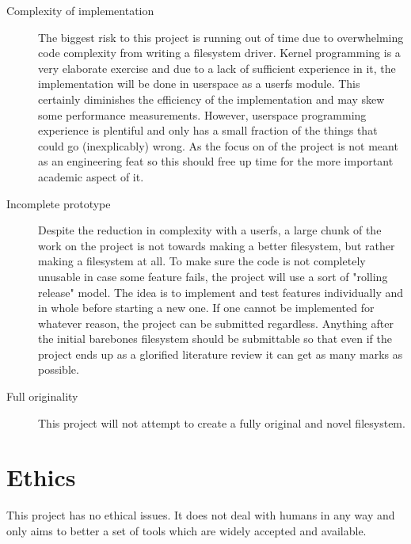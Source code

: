     \begin{description}

        \item[Complexity of implementation] The biggest risk to this project is
            running out of time due to overwhelming code complexity from
            writing a filesystem driver. Kernel programming is a very elaborate
            exercise and due to a lack of sufficient experience in it, the
            implementation will be done in userspace as a userfs module. This
            certainly diminishes the efficiency of the implementation and may
            skew some performance measurements. However, userspace programming
            experience is plentiful and only has a small fraction of the things
            that could go (inexplicably) wrong. As the focus on of the project
            is not meant as an engineering feat so this should free up time for
            the more important academic aspect of it.

        \item[Incomplete prototype] Despite the reduction in complexity with a
            userfs, a large chunk of the work on the project is not towards
            making a better filesystem, but rather making a filesystem at all.
            To make sure the code is not completely unusable in case some
            feature fails, the project will use a sort of "rolling release"
            model. The idea is to implement and test features individually and
            in whole before starting a new one. If one cannot be implemented
            for whatever reason, the project can be submitted regardless.
            Anything after the initial barebones filesystem should be
            submittable so that even if the project ends up as a glorified
            literature review it can get as many marks as possible.

        \item[Full originality] This project will not attempt to create a fully
            original and novel filesystem.

    \end{description}

%
%
\section{Ethics}

    This project has no ethical issues. It does not deal with humans in any way
    and only aims to better a set of tools which are widely accepted and
    available.
